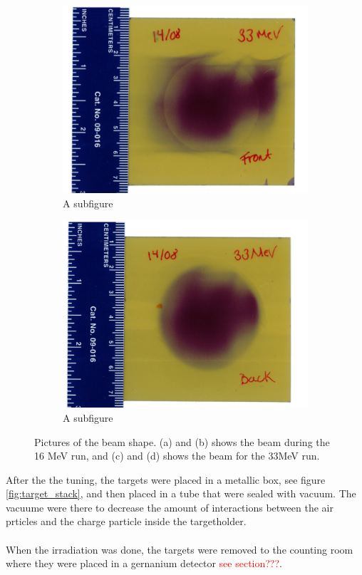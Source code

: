 \documentclass[twoside,english]{uiofysmaster/uiofysmaster}
\begin{document}
\begin{figure} [H]
\begin{subfigure}{.5\textwidth}
  \includegraphics[width=1\linewidth]{33MeV_front.jpeg}
  \caption{A subfigure}
  \label{fig:sub3}
\end{subfigure}%
\begin{subfigure}{.5\textwidth}
  \centering
  \includegraphics[width=1\linewidth]{33MeV_back.jpeg}
  \caption{A subfigure}
  \label{fig:sub4}
\end{subfigure}
\caption{Pictures of the beam shape. (a) and (b) shows the beam during the 16 MeV run, and (c) and (d) shows the beam for the 33MeV run.}
\label{fig:test}
\end{figure}
\noindent
After the the tuning, the targets were placed in a metallic box, see figure \ref{fig:target_stack}, and then placed in a tube that were sealed with vacuum. The vacuume were there to decrease the amount of interactions between the air prticles and the charge particle inside the targetholder. 
\\
\\
When the irradiation was done, the targets were removed to the counting room where they were placed in a gernanium detector \textcolor{red}{see section???}. 
\end{document}
